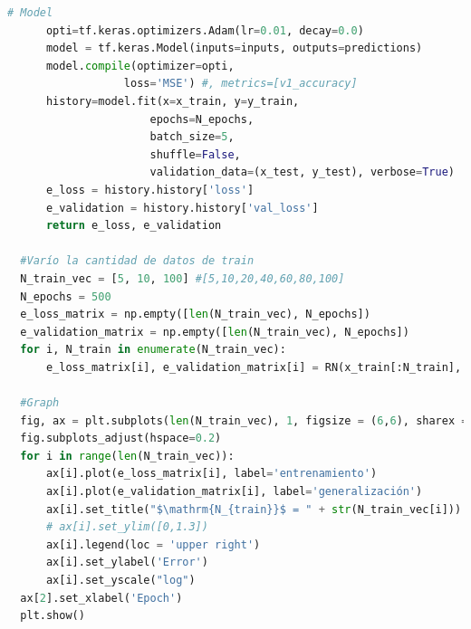 \documentclass[aps,prb,twocolumn,superscriptaddress,floatfix,longbibliography]{revtex4-2}
\begin{document}
\begin{lstlisting}[language=Python]
      # Model 
      opti=tf.keras.optimizers.Adam(lr=0.01, decay=0.0)
      model = tf.keras.Model(inputs=inputs, outputs=predictions)
      model.compile(optimizer=opti,
                  loss='MSE') #, metrics=[v1_accuracy]
      history=model.fit(x=x_train, y=y_train,
                      epochs=N_epochs,
                      batch_size=5,
                      shuffle=False,
                      validation_data=(x_test, y_test), verbose=True)
      e_loss = history.history['loss']
      e_validation = history.history['val_loss']
      return e_loss, e_validation
  
  #Varío la cantidad de datos de train
  N_train_vec = [5, 10, 100] #[5,10,20,40,60,80,100]
  N_epochs = 500
  e_loss_matrix = np.empty([len(N_train_vec), N_epochs])
  e_validation_matrix = np.empty([len(N_train_vec), N_epochs])
  for i, N_train in enumerate(N_train_vec):
      e_loss_matrix[i], e_validation_matrix[i] = RN(x_train[:N_train], y_train[:N_train], x_test, y_test, N_epochs)
  
  #Graph
  fig, ax = plt.subplots(len(N_train_vec), 1, figsize = (6,6), sharex = True)
  fig.subplots_adjust(hspace=0.2)
  for i in range(len(N_train_vec)):
      ax[i].plot(e_loss_matrix[i], label='entrenamiento')
      ax[i].plot(e_validation_matrix[i], label='generalización')
      ax[i].set_title("$\mathrm{N_{train}}$ = " + str(N_train_vec[i]))
      # ax[i].set_ylim([0,1.3])
      ax[i].legend(loc = 'upper right')
      ax[i].set_ylabel('Error')
      ax[i].set_yscale("log")
  ax[2].set_xlabel('Epoch')
  plt.show()

\end{lstlisting}


\end{document}
